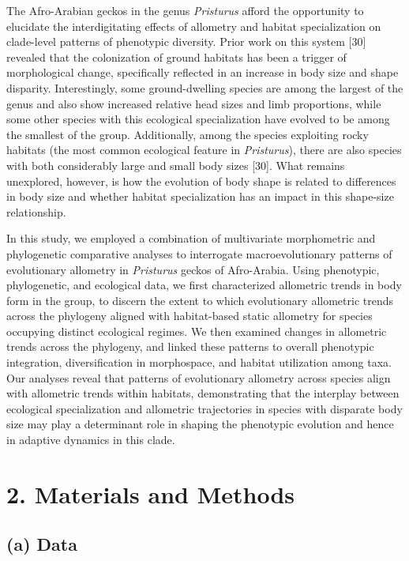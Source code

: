 \documentclass[
  11pt,
]{article}
\begin{document}
The Afro-Arabian geckos in the genus \emph{Pristurus} afford the
opportunity to elucidate the interdigitating effects of allometry and
habitat specialization on clade-level patterns of phenotypic diversity.
Prior work on this system {[}30{]} revealed that the colonization of
ground habitats has been a trigger of morphological change, specifically
reflected in an increase in body size and shape disparity.
Interestingly, some ground-dwelling species are among the largest of the
genus and also show increased relative head sizes and limb proportions,
while some other species with this ecological specialization have
evolved to be among the smallest of the group. Additionally, among the
species exploiting rocky habitats (the most common ecological feature in
\emph{Pristurus}), there are also species with both considerably large
and small body sizes {[}30{]}. What remains unexplored, however, is how
the evolution of body shape is related to differences in body size and
whether habitat specialization has an impact in this shape-size
relationship. \hfill\break

In this study, we employed a combination of multivariate morphometric
and phylogenetic comparative analyses to interrogate macroevolutionary
patterns of evolutionary allometry in \emph{Pristurus} geckos of
Afro-Arabia. Using phenotypic, phylogenetic, and ecological data, we
first characterized allometric trends in body form in the group, to
discern the extent to which evolutionary allometric trends across the
phylogeny aligned with habitat-based static allometry for species
occupying distinct ecological regimes. We then examined changes in
allometric trends across the phylogeny, and linked these patterns to
overall phenotypic integration, diversification in morphospace, and
habitat utilization among taxa. Our analyses reveal that patterns of
evolutionary allometry across species align with allometric trends
within habitats, demonstrating that the interplay between ecological
specialization and allometric trajectories in species with disparate
body size may play a determinant role in shaping the phenotypic
evolution and hence in adaptive dynamics in this clade.

\hypertarget{materials-and-methods}{%
\section{2. Materials and Methods}\label{materials-and-methods}}

\hypertarget{a-data}{%
\subsection{(a) Data}\label{a-data}}
\end{document}
